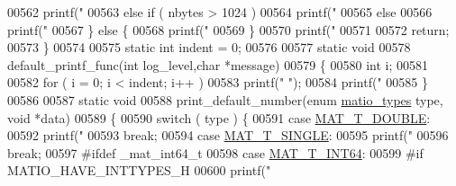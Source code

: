 \begin{DoxyCode}
{{{{{{{{{{{{{{{{{00562             printf(\textcolor{stringliteral}{" %
00563         \textcolor{keywordflow}{else} \textcolor{keywordflow}{if} ( nbytes > 1024 )
00564             printf(\textcolor{stringliteral}{" %
00565         \textcolor{keywordflow}{else}
00566             printf(\textcolor{stringliteral}{" %
00567     \} \textcolor{keywordflow}{else} \{
00568         printf(\textcolor{stringliteral}{"  %
00569     \}
00570     printf(\textcolor{stringliteral}{"  %
00571 
00572     \textcolor{keywordflow}{return};
00573 \}
00574 
00575 \textcolor{keyword}{static} \textcolor{keywordtype}{int} indent = 0;
00576 
00577 \textcolor{keyword}{static} \textcolor{keywordtype}{void}
00578 default\_printf\_func(\textcolor{keywordtype}{int} log\_level,\textcolor{keywordtype}{char} *message)
00579 \{
00580     \textcolor{keywordtype}{int} i;
00581 
00582     \textcolor{keywordflow}{for} ( i = 0; i < indent; i++ )
00583         printf(\textcolor{stringliteral}{"    "});
00584     printf(\textcolor{stringliteral}{"%
00585 \}
00586 
00587 \textcolor{keyword}{static} \textcolor{keywordtype}{void}
00588 print\_default\_number(\textcolor{keyword}{enum} \hyperlink{group___m_a_t_gacf7b3b879282b7ab3a51190e49bf3453}{matio\_types} type, \textcolor{keywordtype}{void} *data)
00589 \{
00590     \textcolor{keywordflow}{switch} ( type ) \{
00591         \textcolor{keywordflow}{case} \hyperlink{group___m_a_t_ggacf7b3b879282b7ab3a51190e49bf3453a31e721ecf7e188196f83c32838288797}{MAT\_T\_DOUBLE}:
00592             printf(\textcolor{stringliteral}{"%
00593             \textcolor{keywordflow}{break};
00594         \textcolor{keywordflow}{case} \hyperlink{group___m_a_t_ggacf7b3b879282b7ab3a51190e49bf3453a3a3657d40e9212c923d9b9d03531b64c}{MAT\_T\_SINGLE}:
00595             printf(\textcolor{stringliteral}{"%
00596             \textcolor{keywordflow}{break};
00597 \textcolor{preprocessor}{#ifdef \_mat\_int64\_t}
00598         \textcolor{keywordflow}{case} \hyperlink{group___m_a_t_ggacf7b3b879282b7ab3a51190e49bf3453a9e825b5d18b8f946eaf2b4b57e51c145}{MAT\_T\_INT64}:
00599 \textcolor{preprocessor}{#if MATIO\_HAVE\_INTTYPES\_H}
00600             printf(\textcolor{stringliteral}{"%
}}}}}}}}}}}}}}}}}}}}}}}}}}
\end{DoxyCode}
